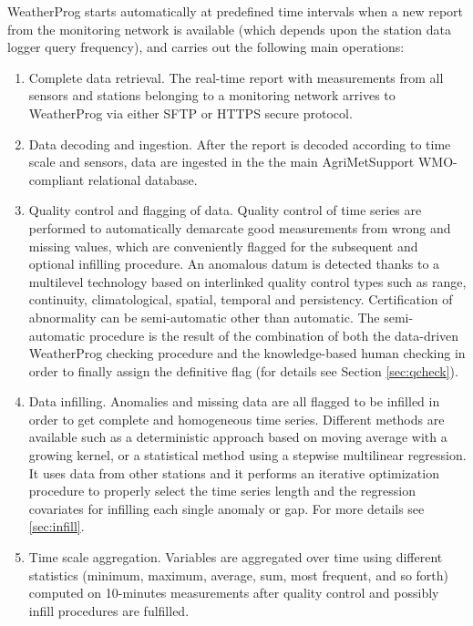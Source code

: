 \documentclass[authoryear,preprint,review,12pt]{elsarticle}
\begin{document}
WeatherProg starts automatically at predefined time intervals when a new report from the monitoring network is available (which depends upon the station data logger query frequency), and carries out the following main operations:
\begin{enumerate}
    \item Complete data retrieval. The real-time report with measurements from all sensors and stations belonging to a monitoring network arrives to WeatherProg via either SFTP or HTTPS secure protocol.
    
    \item Data decoding and ingestion. After the report is decoded according to time scale and sensors, data are ingested in the the main AgriMetSupport WMO-compliant relational database.

    \item Quality control and flagging of data. Quality control of time series are performed to automatically demarcate good measurements from wrong and missing values, which are conveniently flagged for the subsequent and optional infilling procedure.
    An anomalous datum is detected thanks to a multilevel technology based on interlinked quality control types such as range, continuity, climatological, spatial, temporal and persistency.
    Certification of abnormality can be semi-automatic other than automatic.
    The semi-automatic procedure is the result of the combination of both the data-driven WeatherProg checking procedure and the knowledge-based human checking in order to finally assign the definitive flag (for details see Section \ref{sec:qcheck}).
    
    \item Data infilling. Anomalies and missing data are all flagged to be %
    infilled in order to get complete and homogeneous time series.
    Different methods are available such as a deterministic approach based on moving average with a growing kernel, or a statistical method using a stepwise multilinear regression.
    It uses data from other stations and it performs an iterative optimization procedure to properly select the time series length and the regression covariates for infilling each single anomaly or gap.
    For more details see \cref{sec:infill}.
    
    \item Time scale aggregation. Variables are aggregated over time using different statistics (minimum, maximum, average, sum, most frequent, and so forth) computed on 10-minutes measurements after quality control and possibly infill procedures are fulfilled.
    

\end{enumerate}
\end{document}
